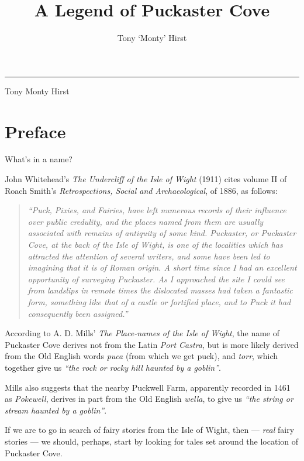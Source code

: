 \documentclass[
  12pt,
  a5paper,
  twoside]{book}
\date{}
\title{A Legend of Puckaster Cove}
\author{Tony `Monty' Hirst}
\date{}
\makeatletter
\let\origtableofcontents\tableofcontents
\renewcommand{\tableofcontents}{%
    \cleardoublepage
    \pagestyle{plain}
    \origtableofcontents
    \cleardoublepage
    \pagestyle{normal} 
  }
\renewcommand{\maketitle}{%
  \thispagestyle{plain}
  \noindent\rule{\linewidth}{1pt}\par
  \begingroup
    \hypersetup{pdfauthor={\@author}, pdftitle={\@title}}%
  \endgroup
  \begin{flushright}
    \vspace{48pt}
    {\headingfont
    {\fontsize{44pt}{56pt}\selectfont \setlength{\baselineskip}{56pt}%
    \@title\par}
    \vspace{96pt}
    {\Large Tony {\textquotesingle}Monty{\textquotesingle} Hirst}\par
    
    \vspace{25pt}
    \@date \par

    }
  \end{flushright}

  

  \setcounter{footnote}{0}
  \let\thanks\relax\let\maketitle\relax
}
\renewcommand*\contentsname{Table of contents}
\newcommand\contentsname{Table of contents}
\makeatother
\begin{document}
\frontmatter
\maketitle

\renewcommand*\contentsname{Contents}
{
\setcounter{tocdepth}{0}
\tableofcontents
}

\mainmatter
{}

\chapter{Preface}\label{preface}

What's in a name?

John Whitehead's \emph{The Undercliff of the Isle of Wight} (1911) cites
volume II of Roach Smith's \emph{Retrospections, Social and
Archaeological}, of 1886, as follows:

\begin{quote}
\emph{``Puck, Pixies, and Fairies, have left numerous records of their
influence over public credulity, and the places named from them are
usually associated with remains of antiquity of some kind. Puckaster, or
Puckaster Cove, at the back of the Isle of Wight, is one of the
localities which has attracted the attention of several writers, and
some have been led to imagining that it is of Roman origin. A short time
since I had an excellent opportunity of surveying Puckaster. As I
approached the site I could see from landslips in remote times the
dislocated masses had taken a fantastic form, something like that of a
castle or fortified place, and to Puck it had consequently been
assigned.''}
\end{quote}

According to A. D. Mills' \emph{The Place-names of the Isle of Wight},
the name of Puckaster Cove derives not from the Latin \emph{Port
Castra}, but is more likely derived from the Old English words
\emph{puca} (from which we get puck), and \emph{torr}, which together
give us \emph{``the rock or rocky hill haunted by a goblin''}.

Mills also suggests that the nearby Puckwell Farm, apparently recorded
in 1461 as \emph{Pokewell}, derives in part from the Old English
\emph{wella}, to give us \emph{``the string or stream haunted by a
goblin''}.

If we are to go in search of fairy stories from the Isle of Wight, then
--- \emph{real} fairy stories --- we should, perhaps, start by looking
for tales set around the location of Puckaster Cove.
\end{document}
